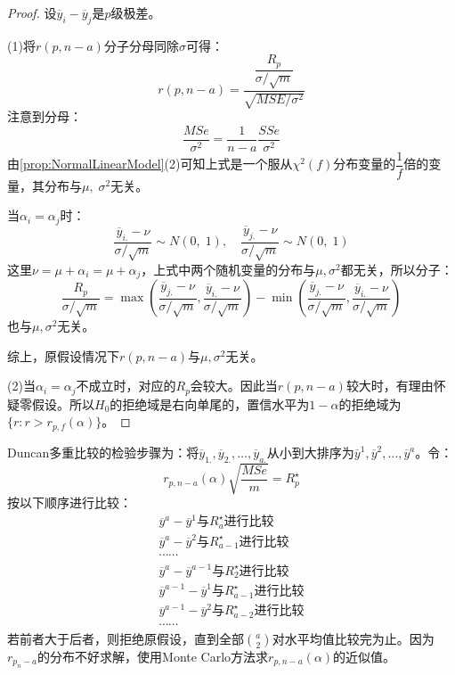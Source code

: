 \begin{proof}
	设$\overline{y}_i-\overline{y}_j$是$p$级极差。\par
	(1)将$r(p,n-a)$分子分母同除$\sigma$可得：
	\begin{equation*}
		r(p,n-a)=\frac{\dfrac{R_p}{\sigma/\sqrt{m}}}{\sqrt{MSE/\sigma^2}}
	\end{equation*}
	注意到分母：
	\begin{equation*}
		\frac{MSe}{\sigma^2}=\frac{1}{n-a}\frac{SSe}{\sigma^2}
	\end{equation*}
	由\cref{prop:NormalLinearModel}(2)可知上式是一个服从$\chi^2(f)$分布变量的$\dfrac{1}{f}$倍的变量，其分布与$\mu,\;\sigma^2$无关。\par
	当$\alpha_i=\alpha_j$时：
	\begin{equation*}
		\frac{\overline{y}_{i.}-\nu}{\sigma/\sqrt{m}}\sim N(0,\;1),\quad\frac{\overline{y}_{j.}-\nu}{\sigma/\sqrt{m}}\sim N(0,\;1)
	\end{equation*}
	这里$\nu=\mu+\alpha_i=\mu+\alpha_j$，上式中两个随机变量的分布与$\mu,\sigma^2$都无关，所以分子：
	\begin{equation*}
		\frac{R_p}{\sigma/\sqrt{m}}=\max(\frac{\overline{y}_{j.}-\nu}{\sigma/\sqrt{m}},\frac{\overline{y}_{i.}-\nu}{\sigma/\sqrt{m}})-\min(\frac{\overline{y}_{j.}-\nu}{\sigma/\sqrt{m}},\frac{\overline{y}_{i.}-\nu}{\sigma/\sqrt{m}})
	\end{equation*}
	也与$\mu,\sigma^2$无关。\par
	综上，原假设情况下$r(p,n-a)$与$\mu,\sigma^2$无关。\par
	(2)当$\alpha_i=\alpha_j$不成立时，对应的$R_p$会较大。因此当$r(p,n-a)$较大时，有理由怀疑零假设。所以$H_0$的拒绝域是右向单尾的，置信水平为$1-\alpha$的拒绝域为$\{r:r>r_{p,f}(\alpha)\}$。
\end{proof}
\begin{note}
	Duncan多重比较的检验步骤为：将$\overline{y}_{1.},\overline{y}_{2.},\dots,\overline{y}_{a.}$从小到大排序为$\overline{y}^1,\overline{y}^2,\dots,\overline{y}^a$。令：
	\begin{equation*}
		r_{p,n-a}(\alpha)\sqrt{\frac{MSe}{m}}=R_p^{\star}
	\end{equation*}
	按以下顺序进行比较：
	\begin{gather*}
		\overline{y}^a-\overline{y}^1\text{与$R_a^{\star}$进行比较} \\
		\overline{y}^a-\overline{y}^2\text{与$R_{a-1}^{\star}$进行比较} \\
		\cdots\cdots \\
		\overline{y}^a-\overline{y}^{a-1}\text{与$R_2^{\star}$进行比较} \\
		\overline{y}^{a-1}-\overline{y}^1\text{与$R_{a-1}^{\star}$进行比较} \\
		\overline{y}^{a-1}-\overline{y}^2\text{与$R_{a-2}^{\star}$进行比较} \\
		\cdots\cdots
	\end{gather*}
	若前者大于后者，则拒绝原假设，直到全部$\binom{a}{2}$对水平均值比较完为止。因为$r_{p_n-a}$的分布不好求解，使用Monte Carlo方法求$r_{p,n-a}(\alpha)$的近似值。
\end{note}
